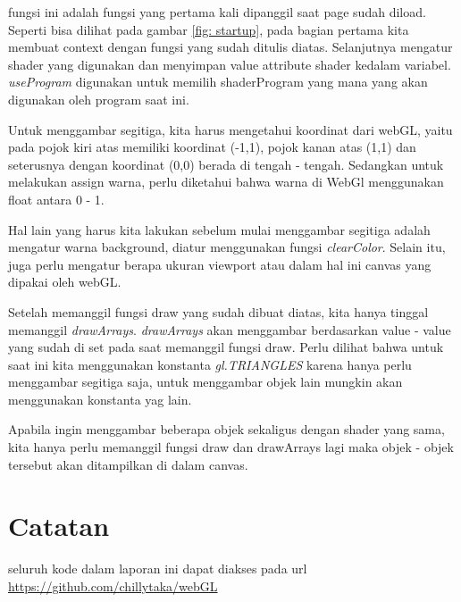 fungsi ini adalah fungsi yang pertama kali dipanggil saat page sudah diload. Seperti bisa dilihat pada gambar \ref{fig: startup},
pada bagian pertama kita membuat context dengan fungsi yang sudah ditulis diatas. Selanjutnya mengatur shader yang digunakan
dan menyimpan value attribute shader kedalam variabel. \emph{useProgram} digunakan untuk memilih shaderProgram yang mana yang akan
digunakan oleh program saat ini.

Untuk menggambar segitiga, kita harus mengetahui koordinat dari webGL, yaitu pada pojok kiri atas memiliki koordinat (-1,1),
pojok kanan atas (1,1) dan seterusnya dengan koordinat (0,0) berada di tengah - tengah. Sedangkan untuk melakukan assign warna,
perlu diketahui bahwa warna di WebGl menggunakan float antara 0 - 1.

Hal lain yang harus kita lakukan sebelum mulai menggambar segitiga adalah mengatur warna background, diatur menggunakan fungsi
\emph{clearColor}. Selain itu, juga perlu mengatur berapa ukuran viewport atau dalam hal ini canvas yang dipakai oleh webGL.

Setelah memanggil fungsi draw yang sudah dibuat diatas, kita hanya tinggal memanggil \emph{drawArrays}. \emph{drawArrays} akan
menggambar berdasarkan value - value yang sudah di set pada saat memanggil fungsi draw. Perlu dilihat bahwa untuk saat ini kita
menggunakan konstanta \emph{gl.TRIANGLES} karena hanya perlu menggambar segitiga saja, untuk menggambar objek lain mungkin akan
menggunakan konstanta yag lain.

Apabila ingin menggambar beberapa objek sekaligus dengan shader yang sama, kita hanya perlu memanggil fungsi draw dan drawArrays lagi
maka  objek - objek tersebut akan ditampilkan di dalam canvas.

\section*{Catatan}
seluruh kode dalam laporan ini dapat diakses pada url \url{https://github.com/chillytaka/webGL}




